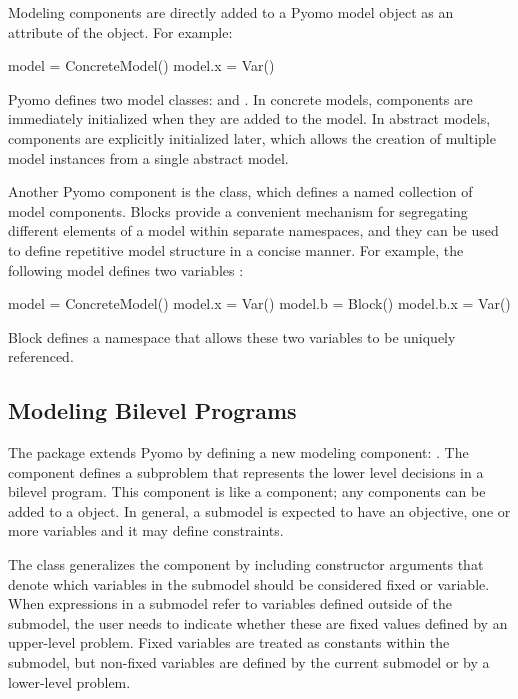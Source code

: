 Modeling components are directly added to a Pyomo model object as an attribute of the object.
For example:
\begin{qlisting}
model = ConcreteModel()
model.x = Var()
\end{qlisting}
Pyomo defines two model classes:  and .  
In concrete models, components are immediately initialized when
they are added to the model.  In abstract models, components are
explicitly initialized later, which allows the creation of multiple
model instances from a single abstract model.

Another Pyomo component is the  class, which defines a
named collection of model components.  Blocks provide a convenient
mechanism for segregating different elements of a model within
separate namespaces, and they can be used to define repetitive model
structure in a concise manner.  For example, the following model
defines two variables :
\begin{qlisting}
model = ConcreteModel()
model.x = Var()
model.b = Block()
model.b.x = Var()
\end{qlisting}
Block  defines a namespace that allows these two variables to be
uniquely referenced.

\subsection{Modeling Bilevel Programs}

The  package extends Pyomo by defining a new
modeling component: .  The  component
defines a subproblem that represents the lower level decisions in
a bilevel program.  This component is like a  component;
any components can be added to a  object.  In general,
a submodel is expected to have an objective, one or more variables
and it may define constraints.

The  class generalizes the  component
by including constructor arguments that denote which variables in
the submodel should be considered fixed or variable.  When expressions
in a submodel refer to variables defined outside of the submodel,
the user needs to indicate whether these are fixed values defined
by an upper-level problem.  Fixed variables are treated as constants
within the submodel, but non-fixed variables are defined by the
current submodel or by a lower-level problem.

